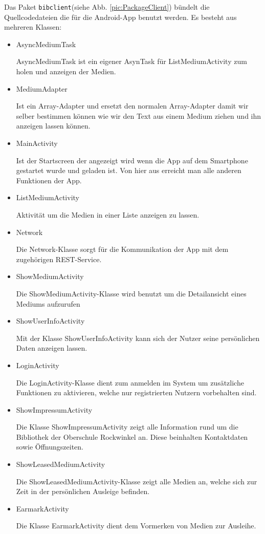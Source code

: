 \documentclass[fontsize=12pt,paper=a4,twoside]{scrartcl}
\begin{document}
Das Paket \texttt{bibclient}(siehe Abb. \vref{pic:PackageClient}) bündelt die Quellcodedateien die für die Android-App benutzt werden. Es besteht aus mehreren Klassen:
\begin{itemize}

\item{AsyncMediumTask}

AsyncMediumTask ist ein eigener AsynTask für ListMediumActivity zum holen und anzeigen der Medien.

\item{MediumAdapter}

Ist ein Array-Adapter und ersetzt den normalen Array-Adapter damit wir selber bestimmen können wie wir den Text aus einem Medium ziehen und ihn anzeigen lassen können.

\newpage
\item{MainActivity}

Ist der Startscreen der angezeigt wird wenn die App auf dem Smartphone gestartet wurde und geladen ist. Von hier aus erreicht man alle anderen Funktionen der App.

\item{ListMediumActivity}

Aktivität um die Medien in einer Liste anzeigen zu lassen.

\item{Network}

Die Network-Klasse sorgt für die Kommunikation der App mit dem zugehörigen REST-Service.

\item{ShowMediumActivity}

Die ShowMediumActivity-Klasse wird benutzt um die Detailansicht eines Mediums aufzurufen

\item{ShowUserInfoActivity}

Mit der Klasse ShowUserInfoActivity kann sich der Nutzer seine persönlichen Daten anzeigen lassen.

\item{LoginActivity}

Die LoginActivity-Klasse dient zum anmelden im System um zusätzliche Funktionen zu aktivieren, welche nur registrierten Nutzern vorbehalten sind.

\item{ShowImpressumActivity}

Die Klasse ShowImpressumActivity zeigt alle Information rund um die Bibliothek der Oberschule Rockwinkel an. Diese beinhalten Kontaktdaten sowie Öffnungszeiten.

\item{ShowLeasedMediumActivity}

Die ShowLeasedMediumActivity-Klasse zeigt alle Medien an, welche sich zur Zeit in der persönlichen Ausleige befinden.

\item{EarmarkActivity}

Die Klasse EarmarkActivity dient dem Vormerken von Medien zur Ausleihe.

\end{itemize}
\end{document}
